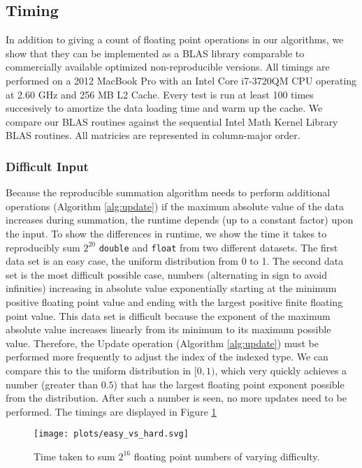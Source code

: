 \subsection{Timing}
  In addition to giving a count of floating point operations in our algorithms, we show that they can be implemented as a BLAS library comparable to commercially available optimized non-reproducible versions.
  All timings are performed on a 2012 MacBook Pro with an Intel Core i7-3720QM CPU operating at 2.60 GHz and 256 MB L2 Cache. Every test is run at least 100 times succesively to amortize the data loading time and warm up the cache. We compare our BLAS routines against the sequential Intel Math Kernel Library BLAS routines. All matricies are represented in column-major order.
  \subsubsection{Difficult Input}
    Because the reproducible summation algorithm needs to perform additional operations (Algorithm \ref{alg:update}) if the maximum absolute value of the data increases during summation, the runtime depends (up to a constant factor) upon the input. To show the differences in runtime, we show the time it takes to reproducibly sum $2^20$ \texttt{double} and \texttt{float} from two different datasets. The first data set is an easy case, the uniform distribution from 0 to 1. The second data set is the most difficult possible case, numbers (alternating in sign to avoid infinities) increasing in absolute value exponentially starting at the minimum positive floating point value and ending with the largest positive finite floating point value. This data set is difficult because the exponent of the maximum absolute value increases linearly from its minimum to its maximum possible value. Therefore, the Update operation (Algorithm \ref{alg:update}) must be performed more frequently to adjust the index of the indexed type. We can compare this to the uniform distribution in $[0, 1)$, which very quickly achieves a number (greater than $0.5$) that has the largest floating point exponent possible from the distribution. After such a number is seen, no more updates need to be performed. The timings are displayed in Figure \ref{fig:easy_vs_hard_timings}
  \begin{figure}[H]
  \begin{center}
  \texttt{[image: plots/easy\_vs\_hard.svg]}
  \caption{Time taken to sum $2^{16}$ floating point numbers of varying difficulty.}
  \label{fig:easy_vs_hard_timings}
  \end{center}
  \end{figure}
